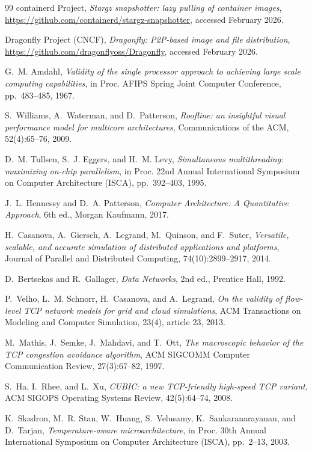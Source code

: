 \documentclass[12pt,a4paper]{report}
\begin{document}
\begin{thebibliography}{99}
containerd Project, \emph{Stargz snapshotter: lazy pulling of container
images}, \url{https://github.com/containerd/stargz-snapshotter},
accessed February 2026.

Dragonfly Project (CNCF), \emph{Dragonfly: P2P-based image and file
distribution}, \url{https://github.com/dragonflyoss/Dragonfly},
accessed February 2026.

G.~M. Amdahl, \emph{Validity of the single processor approach to achieving
large scale computing capabilities}, in Proc. AFIPS Spring Joint Computer
Conference, pp.~483--485, 1967.

S.~Williams, A.~Waterman, and D.~Patterson, \emph{Roofline: an insightful
visual performance model for multicore architectures}, Communications of
the ACM, 52(4):65--76, 2009.

D.~M. Tullsen, S.~J. Eggers, and H.~M. Levy, \emph{Simultaneous
multithreading: maximizing on-chip parallelism}, in Proc. 22nd Annual
International Symposium on Computer Architecture (ISCA), pp.~392--403,
1995.

J.~L. Hennessy and D.~A. Patterson, \emph{Computer Architecture: A
Quantitative Approach}, 6th ed., Morgan Kaufmann, 2017.

H.~Casanova, A.~Giersch, A.~Legrand, M.~Quinson, and F.~Suter,
\emph{Versatile, scalable, and accurate simulation of distributed
applications and platforms}, Journal of Parallel and Distributed
Computing, 74(10):2899--2917, 2014.

D.~Bertsekas and R.~Gallager, \emph{Data Networks}, 2nd ed., Prentice
Hall, 1992.

P.~Velho, L.~M. Schnorr, H.~Casanova, and A.~Legrand, \emph{On the
validity of flow-level TCP network models for grid and cloud
simulations}, ACM Transactions on Modeling and Computer Simulation,
23(4), article 23, 2013.

M.~Mathis, J.~Semke, J.~Mahdavi, and T.~Ott, \emph{The macroscopic
behavior of the TCP congestion avoidance algorithm}, ACM SIGCOMM Computer
Communication Review, 27(3):67--82, 1997.

S.~Ha, I.~Rhee, and L.~Xu, \emph{CUBIC: a new TCP-friendly high-speed TCP
variant}, ACM SIGOPS Operating Systems Review, 42(5):64--74, 2008.

K.~Skadron, M.~R. Stan, W.~Huang, S.~Velusamy, K.~Sankaranarayanan, and
D.~Tarjan, \emph{Temperature-aware microarchitecture}, in Proc. 30th
Annual International Symposium on Computer Architecture (ISCA),
pp.~2--13, 2003.


\end{thebibliography}
\end{document}
